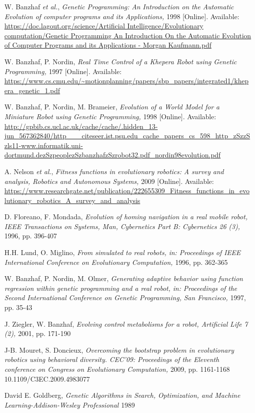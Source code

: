\documentclass[lettersize,journal]{IEEEtran}
\begin{document}
\begin{thebibliography}{1}


W. Banzhaf \emph{et al.}, {\it{Genetic Programming: An Introduction on the Automatic Evolution of computer programs and its Applications, }}1998 [Online]. Available: \url{https://doc.lagout.org/science/Artificial Intelligence/Evolutionary computation/Genetic Programming An Introduction  On the Automatic Evolution of Computer Programs and its Applications - Morgan Kaufmann.pdf}

W. Banzhaf, P. Nordin, {\it{Real Time Control of a Khepera Robot using Genetic Programming, }}1997 [Online]. Available: \url{https://www.cs.cmu.edu/~motionplanning/papers/sbp_papers/integrated1/khepera_genetic_1.pdf}

W. Banzhaf, P. Nordin, M. Brameier, {\it{Evolution of a World Model for a Miniature Robot using Genetic Programming, }}1998 [Online]. Available: \url{http://gpbib.cs.ucl.ac.uk/cache/cache/.hidden_13-jun_567362840/http___citeseer.ist.psu.edu_cache_papers_cs_598_http_zSzzSzls11-www.informatik.uni-dortmund.dezSzpeoplezSzbanzhafzSzrobot32.pdf_nordin98evolution.pdf}

A. Nelson \emph{et al.}, {\it{Fitness functions in evolutionary robotics: A survey and analysis, Robotics and Autonomous Systems, }}2009 [Online]. Available: \url{https://www.researchgate.net/publication/222655309_Fitness_functions_in_evolutionary_robotics_A_survey_and_analysis}

D. Floreano, F. Mondada, {\it{Evolution of homing navigation in a real mobile robot, IEEE Transactions on Systems, Man, Cybernetics Part B: Cybernetics 26 (3), }}1996, pp. 396-407

H.H. Lund, O. Miglino, {\it{From simulated to real robots, in: Proceedings of IEEE International Conference on Evolutionary Computation, }}1996, pp. 362-365

W. Banzhaf, P. Nordin, M. Olmer, {\it{Generating adaptive behavior using function regression within genetic programming and a real robot, in: Proceedings of the Second International Conference on Genetic Programming, San Francisco, }}1997, pp. 35-43

J. Ziegler, W. Banzhaf, {\it{Evolving control metabolisms for a robot, Artificial Life 7 (2), }}2001, pp. 171-190

J-B. Mouret, S. Doncieux, {\it{Overcoming the bootstrap problem in evolutionary robotics using behavioral diversity. CEC'09: Proceedings of the Eleventh conference on Congress on Evolutionary Computation, }}2009, pp. 1161-1168 10.1109/C3EC.2009.4983077

David E. Goldberg,{\it{ Genetic Algorithms in Search, Optimization, and Machine Learning-Addison-Wesley Professional }}1989

\end{thebibliography}
\end{document}
